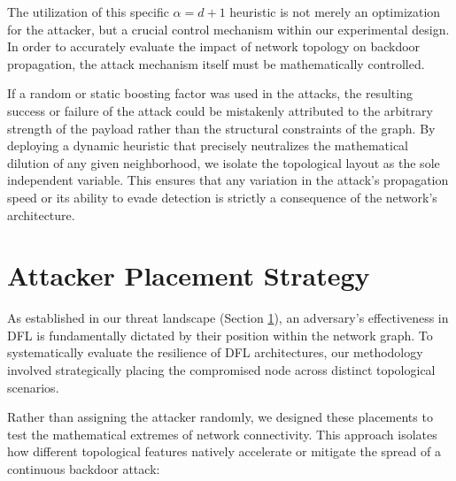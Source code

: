 The utilization of this specific $\alpha = d+1$ heuristic is not merely an optimization for the attacker, but a crucial control mechanism within our experimental design. In order to accurately evaluate the impact of network topology on backdoor propagation, the attack mechanism itself must be mathematically controlled. 

If a random or static boosting factor was used in the attacks, the resulting success or failure of the attack could be mistakenly attributed to the arbitrary strength of the payload rather than the structural constraints of the graph. By deploying a dynamic heuristic that precisely neutralizes the mathematical dilution of any given neighborhood, we isolate the topological layout as the sole independent variable. This ensures that any variation in the attack's propagation speed or its ability to evade detection is strictly a consequence of the network's architecture.

\section{Attacker Placement Strategy} \label{sec:attacker_placement}
As established in our threat landscape (Section \ref{sec:attacker_placement}), an adversary's effectiveness in DFL is fundamentally dictated by their position within the network graph. To systematically evaluate the resilience of DFL architectures, our methodology involved strategically placing the compromised node across distinct topological scenarios. 

Rather than assigning the attacker randomly, we designed these placements to test the mathematical extremes of network connectivity. This approach isolates how different topological features natively accelerate or mitigate the spread of a continuous backdoor attack:

